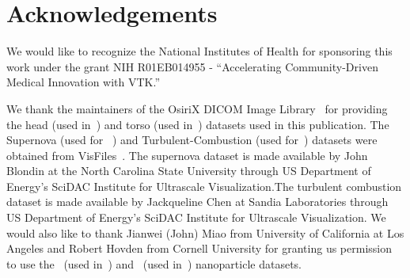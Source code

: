 \section{Acknowledgements}
\label{acknowledgements}
We would like to recognize the National Institutes of Health for sponsoring this
work under the grant NIH R01EB014955 - ``Accelerating Community-Driven Medical
Innovation with VTK.'' 

We thank the maintainers of the OsiriX DICOM Image
Library~\citep{osirix_osirix_2017} for providing the head (used
in~) and torso (used in~) datasets used in this publication. The
Supernova (used for ~) and Turbulent-Combustion (used
for~) datasets were obtained from
VisFiles~\citep{visfiles_visfiles_2007}. The supernova dataset is made available
by John Blondin at the North Carolina State University through US Department
of Energy's SciDAC Institute for Ultrascale Visualization.The turbulent
combustion dataset is made available by Jackqueline Chen at Sandia
Laboratories through US Department of Energy's SciDAC Institute for Ultrascale
Visualization. We would also like to thank Jianwei (John) Miao from University
of California at Los Angeles and Robert Hovden from Cornell University for
granting us permission to use the~ (used in~)
and~ (used in~) nanoparticle datasets.

